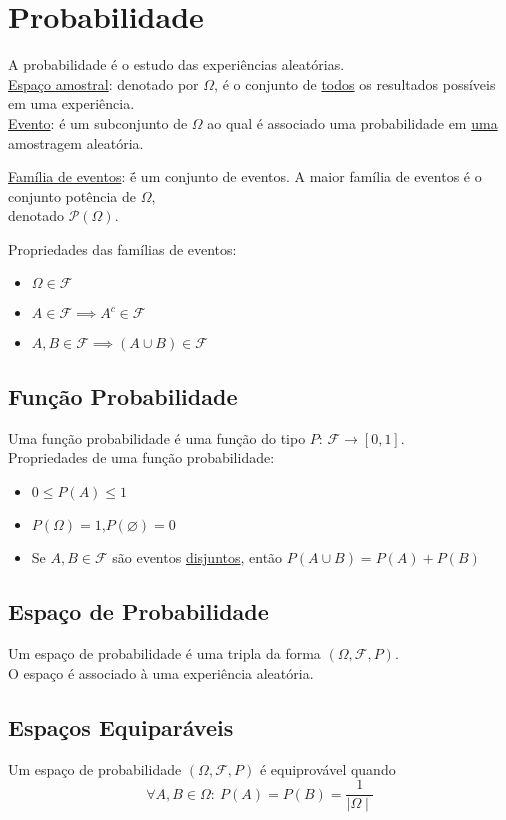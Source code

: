 \documentclass{article}
\begin{document}
\section{Probabilidade}
A probabilidade é o estudo das experiências aleatórias. \\[10pt]
\uline{Espaço amostral}: denotado por $\Omega$, é o conjunto de \uline{todos} os resultados possíveis em uma experiência. \\[5pt]
\uline{Evento}: é um subconjunto de $\Omega$ ao qual é associado uma probabilidade em \uline{uma} amostragem aleatória.
\vspace{-3pt}
\begin{tabbing}
  \uline{Família de eventos}: \= é um conjunto de eventos. A maior família de eventos é o conjunto potência de $\Omega$, \\
  \> denotado $\mathcal{P}(\Omega)$.
\end{tabbing}
Propriedades das famílias de eventos:
\begin{itemize}
  \item $\Omega \in \mathcal{F}$
  \item $A \in \mathcal{F} \implies A^c \in \mathcal{F}$
  \item $A, B \in \mathcal{F} \implies (A \cup B) \in \mathcal{F}$
\end{itemize}


\subsection{Função Probabilidade}
Uma função probabilidade é uma função do tipo $P:\, \mathcal{F} \to [0, 1]$. \\[5pt]
Propriedades de uma função probabilidade:
\begin{itemize}
  \item $0 \leq P(A) \leq 1$
  \item $P(\Omega) = 1$,\enspace $P(\varnothing) = 0$
  \item Se $A, B \in \mathcal{F}$ são eventos \uline{disjuntos}, então $P(A \cup B) = P(A) + P(B)$
\end{itemize}


\subsection{Espaço de Probabilidade}
Um espaço de probabilidade é uma tripla da forma $(\Omega, \mathcal{F}, P)$. \\
O espaço é associado à uma experiência aleatória.


\subsection{Espaços Equiparáveis}
Um espaço de probabilidade $(\Omega, \mathcal{F}, P)$ é equiprovável quando
\[ \forall A, B \in \Omega: \> P(A) = P(B) = \frac{1}{\mid \Omega \mid} \]
\end{document}
